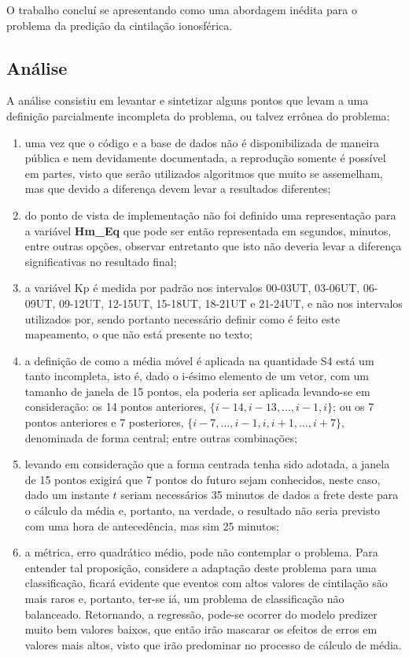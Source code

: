 O trabalho concluí se apresentando como uma abordagem inédita para o problema da predição da cintilação ionosférica.

\subsection{Análise}

A análise consistiu em levantar e sintetizar alguns pontos que levam a uma definição parcialmente incompleta do problema, ou talvez errônea do problema:

\begin{enumerate}
\item uma vez que o código e a base de dados não é disponibilizada de maneira pública e nem devidamente documentada, a reprodução somente é possível em partes, visto que serão utilizados algoritmos que muito se assemelham, mas que devido a diferença devem levar a resultados diferentes;
\item do ponto de vista de implementação não foi definido uma representação para a variável {\bf Hm\_Eq} que pode ser então representada em segundos, minutos, entre outras opções, observar entretanto que isto não deveria levar a diferença significativas no resultado final;
\item a variável Kp é medida por padrão nos intervalos 00-03UT, 03-06UT, 06-09UT, 09-12UT, 12-15UT, 15-18UT, 18-21UT e 21-24UT, e não nos intervalos utilizados por, sendo portanto necessário definir como é feito este mapeamento, o que não está presente no texto;
\item a definição de como a média móvel é aplicada na quantidade S4 está um tanto incompleta, isto é, dado o i-ésimo elemento de um vetor, com um tamanho de janela de 15 pontos, ela poderia ser aplicada levando-se em consideração: os 14 pontos anteriores, $\{i-14, i-13, ..., i-1, i\}$; ou os 7 pontos anteriores e 7 posteriores, $\{i-7,...,i-1,i,i+1,...,i+7\}$, denominada de forma central; entre outras combinações;
\item levando em consideração que a forma centrada tenha sido adotada, a janela de 15 pontos exigirá que 7 pontos do futuro sejam conhecidos, neste caso, dado um instante $t$ seriam necessários 35 minutos de dados a frete deste para o cálculo da média e,  portanto, na verdade, o resultado não seria previsto com uma hora de antecedência, mas sim 25 minutos;
\item a métrica, erro quadrático médio, pode não contemplar o problema. Para entender tal proposição, considere a adaptação deste problema para uma classificação, ficará evidente que eventos com altos valores de cintilação são mais raros e, portanto, ter-se iá, um problema de classificação não balanceado. Retornando, a regressão, pode-se ocorrer do modelo predizer muito bem valores baixos, que então irão mascarar os efeitos de erros em valores mais altos, visto que irão predominar no processo de cálculo de média.
\end{enumerate}

